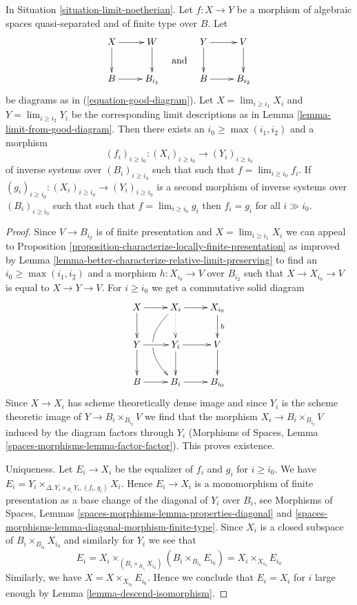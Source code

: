 \begin{lemma}
\label{lemma-morphism-good-diagram}
In Situation \ref{situation-limit-noetherian}.
Let $f : X \to Y$ be a morphism of algebraic spaces quasi-separated
and of finite type over $B$. Let
$$
\vcenter{
\xymatrix{
X \ar[r] \ar[d] & W \ar[d] \\
B \ar[r] & B_{i_1}
}
}
\quad\text{and}\quad
\vcenter{
\xymatrix{
Y \ar[r] \ar[d] & V \ar[d] \\
B \ar[r] & B_{i_2}
}
}
$$
be diagrams as in (\ref{equation-good-diagram}). Let
$X = \lim_{i \geq i_1} X_i$ and
$Y = \lim_{i \geq i_2} Y_i$ be the corresponding
limit descriptions as in Lemma \ref{lemma-limit-from-good-diagram}.
Then there exists an $i_0 \geq \max(i_1, i_2)$ and a morphism
$$
(f_i)_{i \geq i_0} : (X_i)_{i \geq i_0} \to (Y_i)_{i \geq i_0}
$$
of inverse systems over $(B_i)_{i \geq i_0}$ such that
such that $f = \lim_{i \geq i_0} f_i$.
If $(g_i)_{i \geq i_0} : (X_i)_{i \geq i_0} \to (Y_i)_{i \geq i_0}$
is a second morphism of inverse systems over $(B_i)_{i \geq i_0}$ such that
such that $f = \lim_{i \geq i_0} g_i$
then $f_i = g_i$ for all $i \gg i_0$.
\end{lemma}

\begin{proof}
Since $V \to B_{i_2}$ is of finite presentation and
$X = \lim_{i \geq i_1} X_i$ we can appeal to Proposition
\ref{proposition-characterize-locally-finite-presentation}
as improved by Lemma \ref{lemma-better-characterize-relative-limit-preserving}
to find an $i_0 \geq \max(i_1, i_2)$ and a morphism $h : X_{i_0} \to V$
over $B_{i_2}$ such that $X \to X_{i_0} \to V$ is equal to $X \to Y \to V$.
For $i \geq i_0$ we get a commutative solid diagram
$$
\xymatrix{
X \ar[d] \ar[r] &
X_i \ar[r] \ar@{..>}[d] \ar@/_2pc/[dd] |!{[d];[ld]}\hole &
X_{i_0} \ar[d]^h \\
Y \ar[r] \ar[d] & Y_i \ar[r] \ar[d] & V \ar[d] \\
B \ar[r] & B_i \ar[r] & B_{i_0}
}
$$
Since $X \to X_i$ has scheme theoretically dense image
and since $Y_i$ is the scheme theoretic image of
$Y \to B_i \times_{B_{i_2}} V$
we find that the morphism $X_i \to B_i \times_{B_{i_2}} V$
induced by the diagram factors through $Y_i$
(Morphisms of Spaces, Lemma \ref{spaces-morphisms-lemma-factor-factor}).
This proves existence.

\medskip\noindent
Uniqueness. Let $E_i \to X_i$ be the equalizer of $f_i$ and $g_i$
for $i \geq i_0$. We have
$E_i = Y_i \times_{\Delta, Y_i \times_{B_i} Y_i, (f_i, g_i)} X_i$.
Hence $E_i \to X_i$ is a monomorphism of finite presentation as a base
change of the diagonal of $Y_i$ over $B_i$, see
Morphisms of Spaces, Lemmas \ref{spaces-morphisms-lemma-properties-diagonal} and
\ref{spaces-morphisms-lemma-diagonal-morphism-finite-type}.
Since $X_i$ is a closed subspace of $B_i \times_{B_{i_0}} X_{i_0}$
and similarly for $Y_i$ we see that
$$
E_i =
X_i \times_{(B_i \times_{B_{i_0}} X_{i_0})} (B_i \times_{B_{i_0}} E_{i_0}) =
X_i \times_{X_{i_0}} E_{i_0}
$$
Similarly, we have $X = X \times_{X_{i_0}} E_{i_0}$. Hence we conclude
that $E_i = X_i$ for $i$ large enough by Lemma \ref{lemma-descend-isomorphism}.
\end{proof}

